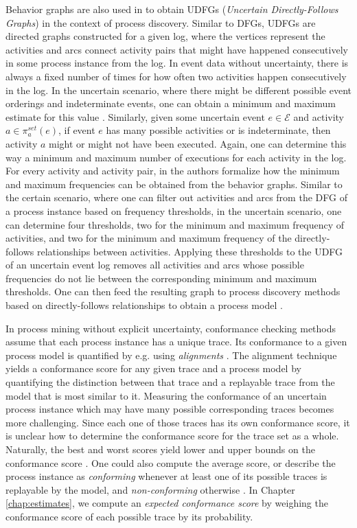 Behavior graphs are also used in \cite{discovery} to obtain UDFGs (\textit{Uncertain Directly-Follows Graphs}) in the context of process discovery.
Similar to DFGs, UDFGs are directed graphs constructed for a given log, where the vertices represent the activities and arcs connect activity pairs that might have happened consecutively in some process instance from the log.
In event data without uncertainty, there is always a fixed number of times for how often two activities happen consecutively in the log. 
In the uncertain scenario, where there might be different possible event orderings and indeterminate events, one can obtain a minimum and maximum estimate for this value \cite{discovery}.
Similarly, given some uncertain event $e \in \mathcal{E}$ and activity $a \in \pi_a^{set}(e)$, if event $e$ has many possible activities or is indeterminate, then activity $a$ might or might not have been executed.
Again, one can determine this way a minimum and maximum number of executions for each activity in the log.
For every activity and activity pair, in \cite{discovery} the authors formalize how the minimum and maximum frequencies can be obtained from the behavior graphs.
Similar to the certain scenario, where one can filter out activities and arcs from the DFG of a process instance based on frequency thresholds, in  the uncertain scenario, one can determine four thresholds, two for the minimum and maximum frequency of activities, and two for the minimum and maximum frequency of the directly-follows relationships between activities.
Applying these thresholds to the UDFG of an uncertain event log removes all activities and arcs whose possible frequencies do not lie between the corresponding minimum and maximum thresholds.
One can then feed the resulting graph to process discovery methods based on directly-follows relationships to obtain a process model \cite{discovery}.


In process mining without explicit uncertainty, conformance checking methods assume that each process instance has a unique trace.
Its conformance to a given process model is quantified by e.g. using \textit{alignments} \cite{alignment}.
The alignment technique yields a conformance score for any given trace and a process model by quantifying the distinction between that trace and a replayable trace from the model that is most similar to it.
Measuring the conformance of an uncertain process instance which may have many possible corresponding traces becomes more challenging.
Since each one of those traces has its own conformance score, it is unclear how to determine the conformance score for the trace set as a whole.
Naturally, the best and worst scores yield lower and upper bounds on the conformance score \cite{conformance}.
One could also compute the average score, or describe the process instance as \textit{conforming} whenever at least one of its possible traces is replayable by the model, and \textit{non-conforming} otherwise \cite{por}.
In Chapter \ref{chap:estimates}, we compute an \textit{expected conformance score} by weighing the conformance score of each possible trace by its probability.

